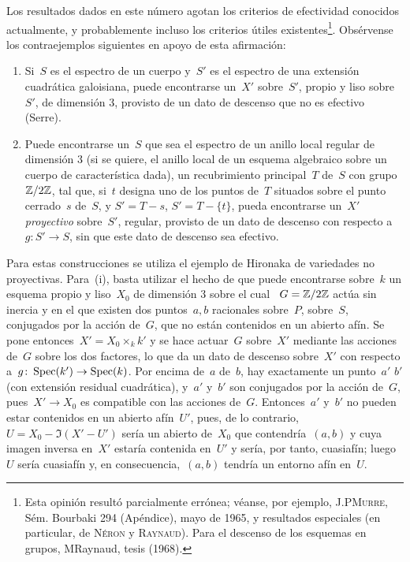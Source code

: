 \begin{remarques}
\label{VIII.7.10}
Los resultados dados en este número agotan los criterios de efectividad
conocidos actualmente, y probablemente incluso los criterios útiles
existentes\footnote{Esta opinión resultó parcialmente errónea; véanse, por
ejemplo, J.P\ptbl \textsc{Murre}, Sém. Bourbaki 294 (Apéndice), mayo de 1965,
y resultados especiales (en particular, de \textsc{Néron} y
\textsc{Raynaud}). Para el descenso de los esquemas en grupos, \cf
M\ptbl Raynaud, tesis (1968).}. Obsérvense los contraejemplos siguientes en
apoyo de esta afirmación:
\begin{enumerate}
\item[(i)]
Si~$S$ es el espectro de un cuerpo y~$S'$ es el espectro de una extensión
cuadrática galoisiana, puede encontrarse un~$X'$ sobre~$S'$, propio y liso
sobre~$S'$, de dimensión 3, provisto de un dato de descenso que no es
efectivo (Serre).
\item[(ii)] Puede encontrarse un~$S$ que sea el espectro de un anillo local regular de
dimensión 3 (si se quiere, el anillo local de un esquema algebraico sobre un
cuerpo de característica dada), un recubrimiento principal~$T$ de~$S$ con
grupo~$\mathbb Z/2\mathbb Z$, tal que, si~$t$ designa uno de los puntos de~$T$ situados
sobre el punto cerrado~$s$ de~$S$, y
{$S'=T-s$,}
{$S'=T-\{t\}$,}
pueda encontrarse un~$X'$ \emph{proyectivo} sobre~$S'$, regular, provisto de
un dato de descenso con respecto a~$g\colon S'\to S$, sin que este dato de
descenso sea efectivo.
\end{enumerate}

Para estas construcciones se utiliza el ejemplo de Hironaka de variedades
no proyectivas. Para~(i), basta utilizar el hecho de que puede encontrarse
sobre~$k$ un esquema propio y liso~$X_{0}$ de dimensión 3 sobre el cual
~$G=\mathbb Z/2\mathbb Z$ actúa sin inercia y en el que existen dos puntos~$a,b$
racionales
{sobre~$P$,}
{sobre~$S$,}
conjugados por la acción de~$G$, que no están contenidos en un abierto afín. Se pone
entonces~$X'=X_{0}\times_{k}k'$ y se hace actuar~$G$ sobre~$X'$ mediante las
acciones de~$G$ sobre los dos factores, lo que da un dato de descenso
sobre~$X'$ con respecto a~$g\colon \operatorname{Spec}(k')\to \operatorname{Spec}(k)$. Por encima de~$a$
\resp de~$b$, hay exactamente un punto~$a'$ \resp $b'$ (con extensión residual
cuadrática), y~$a'$ y~$b'$ son conjugados por la acción de~$G$, pues~$X'\to X_{0}$ es
compatible con las acciones de~$G$. Entonces~$a'$ y~$b'$ no pueden estar
contenidos en un abierto afín~$U'$, pues, de lo contrario,
~$U=X_{0}-\Im(X'-U')$ sería un abierto de~$X_{0}$ que contendría~$(a,b)$ y
cuya imagen inversa en~$X'$ estaría contenida en~$U'$ y sería, por tanto,
cuasiafín; luego~$U$ sería cuasiafín y, en consecuencia,~$(a,b)$ tendría un
entorno afín en~$U$.


\end{remarques}
